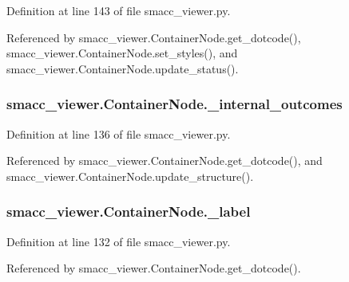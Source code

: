 Definition at line 143 of file smacc\+\_\+viewer.\+py.



Referenced by smacc\+\_\+viewer.\+Container\+Node.\+get\+\_\+dotcode(), smacc\+\_\+viewer.\+Container\+Node.\+set\+\_\+styles(), and smacc\+\_\+viewer.\+Container\+Node.\+update\+\_\+status().

\subsubsection[{\texorpdfstring{\+\_\+internal\+\_\+outcomes}{_internal_outcomes}}]{\setlength{\rightskip}{0pt plus 5cm}smacc\+\_\+viewer.\+Container\+Node.\+\_\+internal\+\_\+outcomes\hspace{0.3cm}{\ttfamily [private]}}\hypertarget{classsmacc__viewer_1_1ContainerNode_a0cecef41d6d1036c4716d1143479743a}{}\label{classsmacc__viewer_1_1ContainerNode_a0cecef41d6d1036c4716d1143479743a}


Definition at line 136 of file smacc\+\_\+viewer.\+py.



Referenced by smacc\+\_\+viewer.\+Container\+Node.\+get\+\_\+dotcode(), and smacc\+\_\+viewer.\+Container\+Node.\+update\+\_\+structure().

\subsubsection[{\texorpdfstring{\+\_\+label}{_label}}]{\setlength{\rightskip}{0pt plus 5cm}smacc\+\_\+viewer.\+Container\+Node.\+\_\+label\hspace{0.3cm}{\ttfamily [private]}}\hypertarget{classsmacc__viewer_1_1ContainerNode_ae088542666a3b43101b59f2e03d22e8b}{}\label{classsmacc__viewer_1_1ContainerNode_ae088542666a3b43101b59f2e03d22e8b}


Definition at line 132 of file smacc\+\_\+viewer.\+py.



Referenced by smacc\+\_\+viewer.\+Container\+Node.\+get\+\_\+dotcode().

